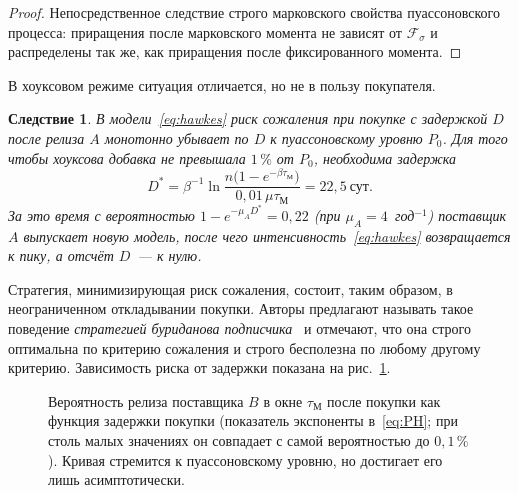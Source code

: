 \documentclass[11pt,a4paper]{article}
\newtheorem{corollary}{Следствие}
\newcommand{\tM}{\tau_{\mathrm{М}}}
\begin{document}
\begin{proof}
Непосредственное следствие строго марковского свойства пуассоновского процесса: приращения после марковского момента не зависят от $\mathcal{F}_\sigma$ и распределены так же, как приращения после фиксированного момента.
\end{proof}

В хоуксовом режиме ситуация отличается, но не в пользу покупателя.

\begin{corollary}
В модели~\eqref{eq:hawkes} риск сожаления при покупке с задержкой $D$ после релиза $A$ монотонно убывает по $D$ к пуассоновскому уровню $P_0$. Для того чтобы хоуксова добавка не превышала $1\,\%$ от $P_0$, необходима задержка
\[
D^\ast = \beta^{-1}\ln\frac{n\bigl(1-e^{-\beta\tM}\bigr)}{0{,}01\,\mu\tM} = 22{,}5~\text{сут}.
\]
За это время с вероятностью $1 - e^{-\mu_A D^\ast} = 0{,}22$ (при $\mu_A = 4$~год$^{-1}$) поставщик $A$ выпускает новую модель, после чего интенсивность~\eqref{eq:hawkes} возвращается к пику, а отсчёт $D$~--- к нулю.
\end{corollary}

Стратегия, минимизирующая риск сожаления, состоит, таким образом, в неограниченном откладывании покупки. Авторы предлагают называть такое поведение \emph{стратегией буриданова подписчика}~\cite{sozhal} и отмечают, что она строго оптимальна по критерию сожаления и строго бесполезна по любому другому критерию. Зависимость риска от задержки показана на рис.~\ref{fig:delay}.

\begin{figure}[htbp]
\centering
{}
\caption{Вероятность релиза поставщика $B$ в окне $\tM$ после покупки как функция задержки покупки (показатель экспоненты в~\eqref{eq:PH}; при столь малых значениях он совпадает с самой вероятностью до $0{,}1\,\%$). Кривая стремится к пуассоновскому уровню, но достигает его лишь асимптотически.}
\label{fig:delay}
\end{figure}
\end{document}
